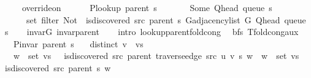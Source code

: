 \begin{isabellebody}
\ \ \ \ \ override{\isacharunderscore}{\kern0pt}on\isanewline
\ \ \ \ \ \ {\isacharparenleft}{\kern0pt}P{\isacharunderscore}{\kern0pt}lookup\ {\isacharparenleft}{\kern0pt}parent\ s{\isacharparenright}{\kern0pt}{\isacharparenright}{\kern0pt}\isanewline
\ \ \ \ \ \ {\isacharparenleft}{\kern0pt}{\isasymlambda}{\isacharunderscore}{\kern0pt}{\isachardot}{\kern0pt}\ Some\ {\isacharparenleft}{\kern0pt}Q{\isacharunderscore}{\kern0pt}head\ {\isacharparenleft}{\kern0pt}queue\ s{\isacharparenright}{\kern0pt}{\isacharparenright}{\kern0pt}{\isacharparenright}{\kern0pt}\isanewline
\ \ \ \ \ \ {\isacharparenleft}{\kern0pt}set\ {\isacharparenleft}{\kern0pt}filter\ {\isacharparenleft}{\kern0pt}Not\ {\isasymcirc}\ is{\isacharunderscore}{\kern0pt}discovered\ src\ {\isacharparenleft}{\kern0pt}parent\ s{\isacharparenright}{\kern0pt}{\isacharparenright}{\kern0pt}\ {\isacharparenleft}{\kern0pt}G{\isachardot}{\kern0pt}adjacency{\isacharunderscore}{\kern0pt}list\ G\ {\isacharparenleft}{\kern0pt}Q{\isacharunderscore}{\kern0pt}head\ {\isacharparenleft}{\kern0pt}queue\ s{\isacharparenright}{\kern0pt}{\isacharparenright}{\kern0pt}{\isacharparenright}{\kern0pt}{\isacharparenright}{\kern0pt}{\isacharparenright}{\kern0pt}{\isachardoublequoteclose}\isanewline
%
\isadelimproof
\ \ %
\endisadelimproof
%
\isatagproof
{}\isamarkupfalse%
\ invar{\isacharunderscore}{\kern0pt}G\ invar{\isacharunderscore}{\kern0pt}parent\isanewline
\ \ \isamarkupfalse%
\ {\isacharparenleft}{\kern0pt}intro\ lookup{\isacharunderscore}{\kern0pt}parent{\isacharunderscore}{\kern0pt}fold{\isacharunderscore}{\kern0pt}cong{\isacharunderscore}{\kern0pt}{}{\isacharparenright}{\kern0pt}%
\endisatagproof
{\isafoldproof}%
%
\isadelimproof
\isanewline
%
\endisadelimproof
\isanewline
{}\isamarkupfalse%
\ {\isacharparenleft}{\kern0pt}\ bfs{\isacharparenright}{\kern0pt}\ T{\isacharunderscore}{\kern0pt}fold{\isacharunderscore}{\kern0pt}cong{\isacharunderscore}{\kern0pt}aux{\isacharcolon}{\kern0pt}\isanewline
\ \ \ {\isachardoublequoteopen}P{\isacharunderscore}{\kern0pt}invar\ {\isacharparenleft}{\kern0pt}parent\ s{\isacharparenright}{\kern0pt}{\isachardoublequoteclose}\isanewline
\ \ \ {\isachardoublequoteopen}distinct\ {\isacharparenleft}{\kern0pt}v\ {\isacharhash}{\kern0pt}\ vs{\isacharparenright}{\kern0pt}{\isachardoublequoteclose}\isanewline
\ \ \ {\isachardoublequoteopen}w\ {\isasymin}\ set\ vs\ {\isasymand}\ {\isasymnot}\ is{\isacharunderscore}{\kern0pt}discovered\ src\ {\isacharparenleft}{\kern0pt}parent\ {\isacharparenleft}{\kern0pt}traverse{\isacharunderscore}{\kern0pt}edge\ src\ u\ v\ s{\isacharparenright}{\kern0pt}{\isacharparenright}{\kern0pt}\ w\ {\isasymlongleftrightarrow}\ w\ {\isasymin}\ set\ vs\ {\isasymand}\ {\isasymnot}\ is{\isacharunderscore}{\kern0pt}discovered\ src\ {\isacharparenleft}{\kern0pt}parent\ s{\isacharparenright}{\kern0pt}\ w{\isachardoublequoteclose}\isanewline

\end{isabellebody}
